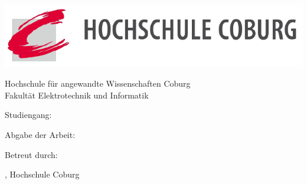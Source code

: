 
\begin{titlepage}
    \begin{center}
    \includegraphics[width=\textwidth]{Bilder/Titelseite/Logo_HS_Coburg}
        \begin{Large}
        Hochschule für angewandte Wissenschaften Coburg
        \\
        Fakultät Elektrotechnik und Informatik
        \par
        \end{Large}
        \vspace{1.5cm}
        
        \begin{Large}
            Studiengang: \Studiengang
            \par
        \end{Large}
        \vspace{1.5cm}
        
        \begin{Large}
        	\Dokumentenart
        \end{Large}
        \vspace{1cm}
        
        \begin{Huge}
        	\textbf{\Dokumententitel}
        \end{Huge}
        
        \vspace{2cm}
        
        \begin{huge}
        	\Autorenname
        \end{huge}
        \vspace{2cm}
        
        \begin{Large}
        	Abgabe der Arbeit: \Abgabedatum
        \end{Large}
        
        \begin{Large}
        	Betreut durch:
        \end{Large}
        
        \begin{Large}
        	\Betreuer , Hochschule Coburg
        \end{Large}
        
	\end{center}
    
\end{titlepage}

\restoregeometry
